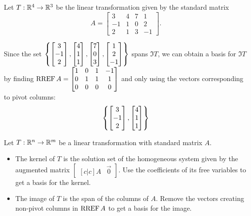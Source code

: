 \begin{observation}
Let $T: \mathbb{R}^4 \rightarrow \mathbb{R}^3$ be the linear transformation given by the
standard matrix
\[
  A
    =
  \begin{bmatrix} 3 & 4 & 7 & 1\\ -1 & 1 & 0 & 2 \\ 2 & 1 & 3 & -1 \end{bmatrix}
.\]

Since the set
\(
  \left\{
    \begin{bmatrix}3\\-1\\2\end{bmatrix},
    \begin{bmatrix}4\\1\\1\end{bmatrix},
    \begin{bmatrix}7\\0\\3\end{bmatrix},
    \begin{bmatrix}1\\2\\-1\end{bmatrix}
  \right\}
\)
spans \(\Im T\), we can obtain a basis for \(\Im T\) by finding
\(
  \operatorname{RREF} A
    =
  \begin{bmatrix} 1 & 0 & 1 & -1\\ 0 & 1 & 1 & 1 \\ 0 & 0 & 0 & 0 \end{bmatrix}
\)
and only using the vectors corresponding to pivot columns:
\[
  \left\{
    \begin{bmatrix}3\\-1\\2\end{bmatrix},
    \begin{bmatrix}4\\1\\1\end{bmatrix}
  \right\}
\]
\end{observation}

\begin{fact}
Let  $T:\mathbb{R}^n\to\mathbb{R}^m$ be a linear transformation with standard matrix $A$.

\begin{itemize}
\item The kernel of \(T\) is the solution set of the homogeneous system given
by the augmented matrix $\begin{bmatrix}[c|c]A&\vec 0\end{bmatrix}$.
Use the coefficients of its free variables to get a basis for the kernel.
\item The image of \(T\) is the span of the columns of \(A\). Remove
the vectors creating non-pivot columns in \(\operatorname{RREF} A\) to get a basis
for the image.
\end{itemize}
\end{fact}



